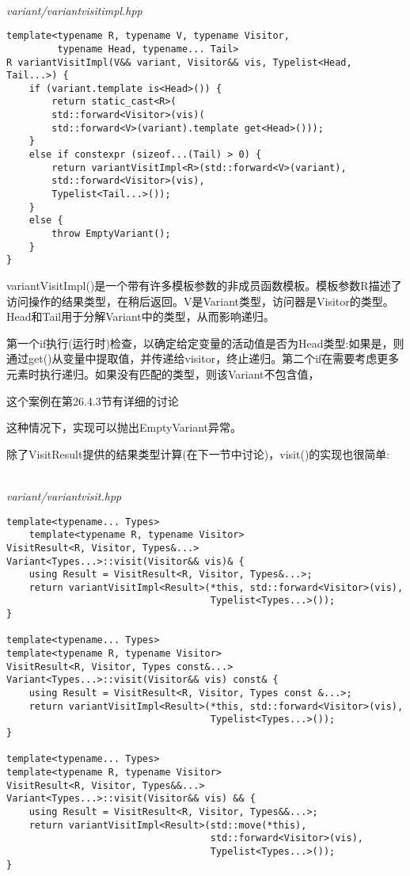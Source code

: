 \hspace*{\fill} \\ %
\noindent
\textit{variant/variantvisitimpl.hpp}
\begin{lstlisting}[style=styleCXX]
template<typename R, typename V, typename Visitor,
		 typename Head, typename... Tail>
R variantVisitImpl(V&& variant, Visitor&& vis, Typelist<Head, Tail...>) {
	if (variant.template is<Head>()) {
		return static_cast<R>(
		std::forward<Visitor>(vis)(
		std::forward<V>(variant).template get<Head>()));
	}
	else if constexpr (sizeof...(Tail) > 0) {
		return variantVisitImpl<R>(std::forward<V>(variant),
		std::forward<Visitor>(vis),
		Typelist<Tail...>());
	}
	else {
		throw EmptyVariant();
	}
}
\end{lstlisting}

variantVisitImpl()是一个带有许多模板参数的非成员函数模板。模板参数R描述了访问操作的结果类型，在稍后返回。V是Variant类型，访问器是Visitor的类型。Head和Tail用于分解Variant中的类型，从而影响递归。

第一个if执行(运行时)检查，以确定给定变量的活动值是否为Head类型:如果是，则通过get()从变量中提取值，并传递给visitor，终止递归。第二个if在需要考虑更多元素时执行递归。如果没有匹配的类型，则该Variant不包含值，

\begin{tcolorbox}[colback=webgreen!5!white,colframe=webgreen!75!black]
\hspace*{0.75cm}这个案例在第26.4.3节有详细的讨论
\end{tcolorbox}

这种情况下，实现可以抛出EmptyVariant异常。

除了VisitResult提供的结果类型计算(在下一节中讨论)，visit()的实现也很简单:

\hspace*{\fill} \\ %
\noindent
\textit{variant/variantvisit.hpp}
\begin{lstlisting}[style=styleCXX]
template<typename... Types>
	template<typename R, typename Visitor>
VisitResult<R, Visitor, Types&...>
Variant<Types...>::visit(Visitor&& vis)& {
	using Result = VisitResult<R, Visitor, Types&...>;
	return variantVisitImpl<Result>(*this, std::forward<Visitor>(vis),
									Typelist<Types...>());
}

template<typename... Types>
template<typename R, typename Visitor>
VisitResult<R, Visitor, Types const&...>
Variant<Types...>::visit(Visitor&& vis) const& {
	using Result = VisitResult<R, Visitor, Types const &...>;
	return variantVisitImpl<Result>(*this, std::forward<Visitor>(vis),
									Typelist<Types...>());
}

template<typename... Types>
template<typename R, typename Visitor>
VisitResult<R, Visitor, Types&&...>
Variant<Types...>::visit(Visitor&& vis) && {
	using Result = VisitResult<R, Visitor, Types&&...>;
	return variantVisitImpl<Result>(std::move(*this),
									std::forward<Visitor>(vis),
									Typelist<Types...>());
}
\end{lstlisting}

